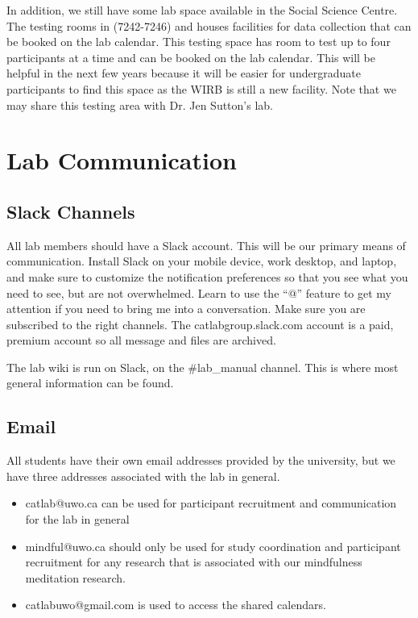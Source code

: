\documentclass{article}
\begin{document}
In addition, we still have some lab space available in the Social Science Centre. The testing rooms in (7242-7246) and houses facilities for data collection that can be booked on the lab calendar. This testing space has room to test up to four participants at a time and can be booked on the lab calendar. This will be helpful in the next few years because it will be easier for undergraduate participants to find this space as the WIRB is still a new facility. Note that we may share this testing area with Dr. Jen Sutton's lab. 

\section{Lab Communication}

\subsection{Slack Channels}
All lab members should have a Slack account. This will be our primary means of communication. Install Slack on your mobile device, work desktop, and laptop, and make sure to customize the notification preferences so that you see what you need to see, but are not overwhelmed. Learn to use the ``@'' feature to get my attention if you need to bring me into a conversation. Make sure you are subscribed to the right channels. The catlabgroup.slack.com account is a paid, premium account so all message and files are archived. 

The lab wiki is run on Slack, on the \#lab\_manual channel. This is where most general information can be found. 

\subsection{Email}
All students have their own email addresses provided by the university, but we have three addresses associated with the lab in general. 
\begin{itemize}
\item catlab@uwo.ca can be used for participant recruitment and communication for the lab in general 
\item mindful@uwo.ca should only be used for study coordination and participant recruitment for any research that is associated with our mindfulness meditation research.
\item catlabuwo@gmail.com is used to access the shared calendars.
\end{itemize}
\end{document}

